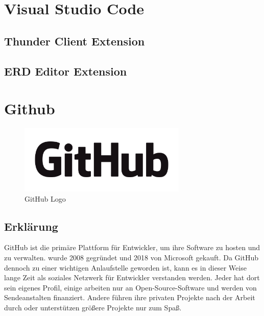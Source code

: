 \section{Visual Studio Code}
\author{unknown}
\lipsum[10-15]

\subsection{Thunder Client Extension}
\author{Stefano Pyringer}
\lipsum[5-10]

\subsection{ERD Editor Extension}
\author{Stefano Pyringer}
\lipsum[5-10]
\newpage

\section{Github}
\author{Mirzet Sakonjic}
\cite{GitHub}
\begin{figure}[h]
    \begin{center}
        \includegraphics*[width=8cm]{pics/GitHub_Logo.png}
        \caption[gitHub Logo]{GitHub Logo \cite{GithubLogo}}
    \end{center}
\end{figure}
\subsection*{Erklärung}
GitHub ist die primäre Plattform für Entwickler, um ihre Software zu hosten 
und zu verwalten. wurde 2008 gegründet und 2018 von Microsoft gekauft. 
Da GitHub dennoch zu einer wichtigen Anlaufstelle geworden ist, 
kann es in dieser Weise lange Zeit als soziales Netzwerk für Entwickler 
verstanden werden. Jeder hat dort sein eigenes Profil, einige arbeiten 
nur an Open-Source-Software und werden von Sendeanstalten finanziert. 
Andere führen ihre privaten Projekte nach der Arbeit durch oder unterstützen 
größere Projekte nur zum Spaß.
